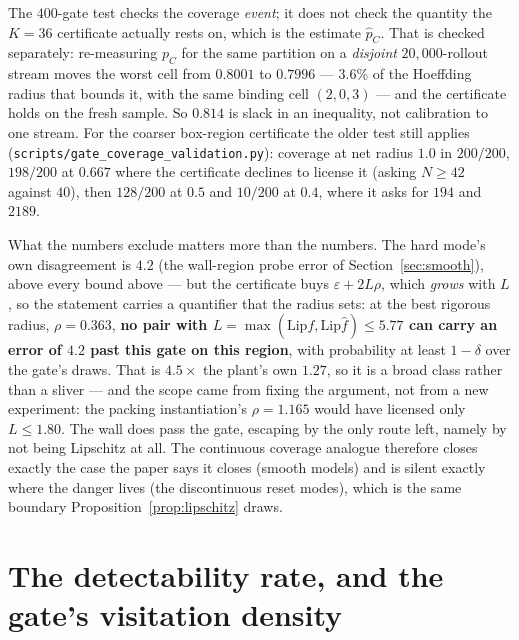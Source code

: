 \documentclass[11pt]{article}
\theoremstyle{definition}
\theoremstyle{remark}
\begin{document}
The $400$-gate test checks the coverage \emph{event}; it does not check the quantity the $K = 36$ certificate actually rests on, which is the estimate $\hat p_C$. That is checked separately: re-measuring $p_C$ for the same partition on a \emph{disjoint} $20{,}000$-rollout stream moves the worst cell from $0.8001$ to $0.7996$ --- $3.6\%$ of the Hoeffding radius that bounds it, with the same binding cell $(2,0,3)$ --- and the certificate holds on the fresh sample. So $0.814$ is slack in an inequality, not calibration to one stream. For the coarser box-region certificate the older test still applies (\texttt{scripts/\allowbreak gate\_\allowbreak coverage\_\allowbreak validation.py}): coverage at net radius $1.0$ in $200/200$, $198/200$ at $0.667$ where the certificate declines to license it (asking $N \geq 42$ against $40$), then $128/200$ at $0.5$ and $10/200$ at $0.4$, where it asks for $194$ and $2189$.

What the numbers exclude matters more than the numbers. The hard mode's own disagreement is $4.2$ (the wall-region probe error of Section~\ref{sec:smooth}), above every bound above --- but the certificate buys $\varepsilon + 2L\rho$, which \emph{grows} with $L$, so the statement carries a quantifier that the radius sets: at the best rigorous radius, $\rho = 0.363$, \textbf{no pair with $L = \max(\mathrm{Lip} f, \mathrm{Lip}\hat f) \leq 5.77$ can carry an error of $4.2$ past this gate on this region}, with probability at least $1-\delta$ over the gate's draws. That is $4.5\times$ the plant's own $1.27$, so it is a broad class rather than a sliver --- and the scope came from fixing the argument, not from a new experiment: the packing instantiation's $\rho = 1.165$ would have licensed only $L \leq 1.80$. The wall does pass the gate, escaping by the only route left, namely by not being Lipschitz at all. The continuous coverage analogue therefore closes exactly the case the paper says it closes (smooth models) and is silent exactly where the danger lives (the discontinuous reset modes), which is the same boundary Proposition~\ref{prop:lipschitz} draws.


\section{The detectability rate, and the gate's visitation density}
\label{sup:detect}
\end{document}
